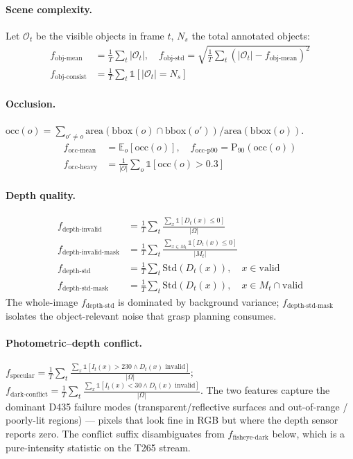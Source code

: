 \paragraph{Scene complexity.}
Let $\mathcal{O}_t$ be the visible objects in frame $t$, $N_s$ the total annotated objects:
\begin{align}
f_{\text{obj-mean}} &= \frac{1}{T}\textstyle\sum_t |\mathcal{O}_t|, \quad
f_{\text{obj-std}} = \sqrt{\frac{1}{T}\textstyle\sum_t (|\mathcal{O}_t| - f_{\text{obj-mean}})^2} \\
f_{\text{obj-consist}} &= \frac{1}{T}\textstyle\sum_t \mathbb{1}[|\mathcal{O}_t| = N_s]
\end{align}

\paragraph{Occlusion.}
$\text{occ}(o) = \sum_{o'\neq o} \text{area}(\text{bbox}(o) \cap \text{bbox}(o')) / \text{area}(\text{bbox}(o))$.
\begin{align}
f_{\text{occ-mean}} &= \mathbb{E}_o[\text{occ}(o)], \quad
f_{\text{occ-p90}} = \text{P}_{90}(\text{occ}(o)) \\
f_{\text{occ-heavy}} &= \frac{1}{|\mathcal{O}|}\textstyle\sum_o \mathbb{1}[\text{occ}(o) > 0.3]
\end{align}

\paragraph{Depth quality.}
\begin{align}
f_{\text{depth-invalid}} &= \frac{1}{T}\textstyle\sum_t \frac{\sum_x \mathbb{1}[D_t(x) \leq 0]}{|\Omega|} \\
f_{\text{depth-invalid-mask}} &= \frac{1}{T}\textstyle\sum_t \frac{\sum_{x \in M_t} \mathbb{1}[D_t(x) \leq 0]}{|M_t|} \\
f_{\text{depth-std}} &= \frac{1}{T}\textstyle\sum_t \text{Std}(D_t(x)), \quad x \in \text{valid} \\
f_{\text{depth-std-mask}} &= \frac{1}{T}\textstyle\sum_t \text{Std}(D_t(x)), \quad x \in M_t \cap \text{valid}
\end{align}
The whole-image $f_{\text{depth-std}}$ is dominated by background variance; $f_{\text{depth-std-mask}}$ isolates the object-relevant noise that grasp planning consumes.

\paragraph{Photometric--depth conflict.}
$f_{\text{specular}} = \frac{1}{T}\sum_t \frac{\sum_x \mathbb{1}[I_t(x) > 230 \land D_t(x)\text{ invalid}]}{|\Omega|}$; \;
$f_{\text{dark-conflict}} = \frac{1}{T}\sum_t \frac{\sum_x \mathbb{1}[I_t(x) < 30 \land D_t(x)\text{ invalid}]}{|\Omega|}$.
The two features capture the dominant D435 failure modes (transparent/reflective surfaces and out-of-range / poorly-lit regions) — pixels that look fine in RGB but where the depth sensor reports zero. The $\text{conflict}$ suffix disambiguates from $f_{\text{fisheye-dark}}$ below, which is a pure-intensity statistic on the T265 stream.

